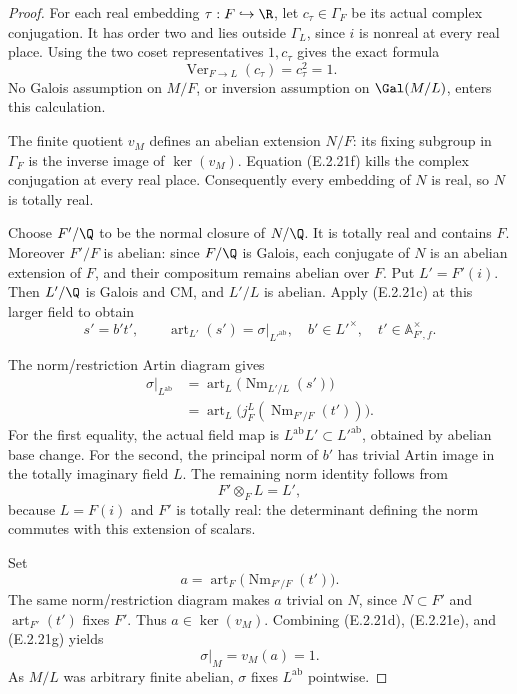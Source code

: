 \begin{proof}
For each real embedding \(\tau:F\hookrightarrow\R\),
let \(c_\tau\in\Gamma_F\) be its actual complex
conjugation. It has order two and lies outside
\(\Gamma_L\), since \(i\) is nonreal at every real
place. Using the two coset representatives
\(1,c_\tau\) gives the exact formula
\[
 \operatorname{Ver}_{F\to L}(c_\tau)=c_\tau^2=1.
 \tag{E.2.21f}
\]
No Galois assumption on \(M/F\), or inversion
assumption on \(\Gal(M/L)\), enters this calculation.

The finite quotient \(v_M\) defines an abelian
extension \(N/F\): its fixing subgroup in
\(\Gamma_F\) is the inverse image of
\(\ker(v_M)\). Equation (E.2.21f) kills the
complex conjugation at every real place.
Consequently every embedding of \(N\) is real,
so \(N\) is totally real.

Choose \(F'/\Q\) to be the normal closure of
\(N/\Q\). It is totally real and contains \(F\).
Moreover \(F'/F\) is abelian: since \(F/\Q\)
is Galois, each conjugate of \(N\) is an abelian
extension of \(F\), and their compositum remains
abelian over \(F\). Put \(L'=F'(i)\).
Then \(L'/\Q\) is Galois and CM, and \(L'/L\)
is abelian. Apply (E.2.21c) at this larger
field to obtain
\[
 s'=b't',\qquad
 \operatorname{art}_{L'}(s')
      =\sigma|_{L'^{\mathrm{ab}}},
 \quad b'\in L'^\times,\quad
 t'\in\mathbb A_{F',f}^{\times}.
\]

The norm/restriction Artin diagram gives
\[
 \begin{split}
 \sigma|_{L^{\mathrm{ab}}}
  &=\operatorname{art}_L
       \bigl(\operatorname{Nm}_{L'/L}(s')\bigr)\\
  &=\operatorname{art}_L
       \bigl(j_F^L(\operatorname{Nm}_{F'/F}(t'))\bigr).
 \end{split}
 \tag{E.2.21g}
\]
For the first equality, the actual field map is
\(L^{\mathrm{ab}}L'\subset L'^{\mathrm{ab}}\),
obtained by abelian base change.
For the second, the principal norm of \(b'\)
has trivial Artin image in the totally imaginary
field \(L\). The remaining norm identity follows
from
\[
 F'\otimes_F L=L',
\]
because \(L=F(i)\) and \(F'\) is totally real:
the determinant defining the norm commutes with
this extension of scalars.

Set
\[
 a=\operatorname{art}_F
       \bigl(\operatorname{Nm}_{F'/F}(t')\bigr).
\]
The same norm/restriction diagram makes \(a\)
trivial on \(N\), since \(N\subset F'\) and
\(\operatorname{art}_{F'}(t')\) fixes \(F'\).
Thus \(a\in\ker(v_M)\). Combining (E.2.21d),
(E.2.21e), and (E.2.21g) yields
\[
 \sigma|_M=v_M(a)=1.
\]
As \(M/L\) was arbitrary finite abelian, \(\sigma\)
fixes \(L^{\mathrm{ab}}\) pointwise.


\end{proof}
